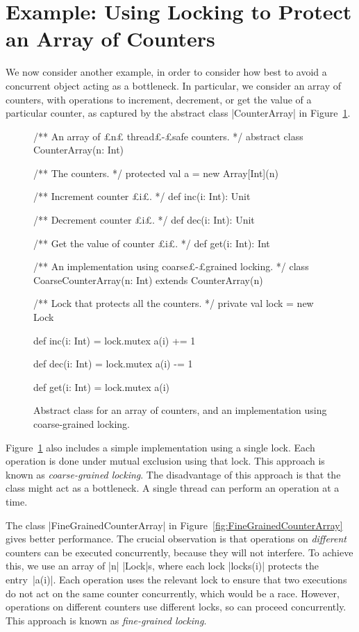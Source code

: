 \section{Example: Using Locking to Protect an Array of Counters}

We now consider another example, in order to consider how best to avoid a
concurrent object acting as a bottleneck.  In particular, we consider an array
of counters, with operations to increment, decrement, or get the value of a
particular counter, as captured by the abstract class |CounterArray| in
Figure~\ref{fig:CounterArray}. 


\begin{figure}[bhtp]
\begin{scala}
/** An array of £n£ thread£-£safe counters. */
abstract class CounterArray(n: Int){
  /** The counters. */
  protected val a = new Array[Int](n)

  /** Increment counter £i£. */
  def inc(i: Int): Unit

  /** Decrement counter £i£. */
  def dec(i: Int): Unit

  /** Get the value of counter £i£. */
  def get(i: Int): Int
}

/** An implementation using coarse£-£grained locking. */
class CoarseCounterArray(n: Int) extends CounterArray(n){
  /** Lock that protects all the counters. */
  private val lock = new Lock

  def inc(i: Int) = lock.mutex{ a(i) += 1 }

  def dec(i: Int) = lock.mutex{ a(i) -= 1 }

  def get(i: Int) = lock.mutex{ a(i) }
}
\end{scala}
\caption{Abstract class for an array of counters, and an implementation using
  coarse-grained locking.}
\label{fig:CounterArray}
\end{figure}


Figure~\ref{fig:CounterArray} also includes a simple implementation using a
single lock.  Each operation is done under mutual exclusion using that lock.
This approach is known as \emph{coarse-grained locking}.  The disadvantage of
this approach is that the class might act as a bottleneck.  A single thread
can perform an operation at a time.


The class |FineGrainedCounterArray| in
Figure~\ref{fig:FineGrainedCounterArray} gives better performance.  The
crucial observation is that operations on \emph{different} counters can be
executed concurrently, because they will not interfere.  To achieve this, we
use an array of |n| |Lock|s, where each lock |locks(i)| protects the
entry~|a(i)|.  Each operation uses the relevant lock to ensure that two
executions do not act on the same counter concurrently, which would be a race.
However, operations on different counters use different locks, so can proceed
concurrently.  This approach is known as \emph{fine-grained locking}.

